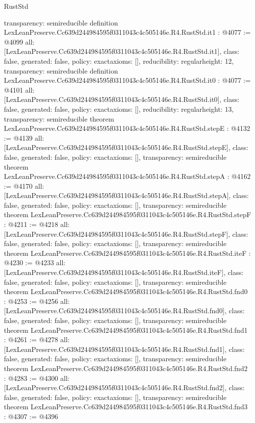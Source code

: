 \begin{lexlean}{RustStd}
\begin{coremodule}
{  transparency: semireducible
}
definition LexLeanPreserve.Cc639d244984595f0311043c4c505146e.R4.RustStd.it1 : @4077 := @4099 {
  all: [LexLeanPreserve.Cc639d244984595f0311043c4c505146e.R4.RustStd.it1],
  class: false,
  generated: false,
  policy: exact{axioms: []},
  reducibility: regular{height: 12},
  transparency: semireducible
}
definition LexLeanPreserve.Cc639d244984595f0311043c4c505146e.R4.RustStd.it0 : @4077 := @4101 {
  all: [LexLeanPreserve.Cc639d244984595f0311043c4c505146e.R4.RustStd.it0],
  class: false,
  generated: false,
  policy: exact{axioms: []},
  reducibility: regular{height: 13},
  transparency: semireducible
}
theorem LexLeanPreserve.Cc639d244984595f0311043c4c505146e.R4.RustStd.stepE : @4132 := @4139 {
  all: [LexLeanPreserve.Cc639d244984595f0311043c4c505146e.R4.RustStd.stepE],
  class: false,
  generated: false,
  policy: exact{axioms: []},
  transparency: semireducible
}
theorem LexLeanPreserve.Cc639d244984595f0311043c4c505146e.R4.RustStd.stepA : @4162 := @4170 {
  all: [LexLeanPreserve.Cc639d244984595f0311043c4c505146e.R4.RustStd.stepA],
  class: false,
  generated: false,
  policy: exact{axioms: []},
  transparency: semireducible
}
theorem LexLeanPreserve.Cc639d244984595f0311043c4c505146e.R4.RustStd.stepF : @4211 := @4218 {
  all: [LexLeanPreserve.Cc639d244984595f0311043c4c505146e.R4.RustStd.stepF],
  class: false,
  generated: false,
  policy: exact{axioms: []},
  transparency: semireducible
}
theorem LexLeanPreserve.Cc639d244984595f0311043c4c505146e.R4.RustStd.iteF : @4230 := @4233 {
  all: [LexLeanPreserve.Cc639d244984595f0311043c4c505146e.R4.RustStd.iteF],
  class: false,
  generated: false,
  policy: exact{axioms: []},
  transparency: semireducible
}
theorem LexLeanPreserve.Cc639d244984595f0311043c4c505146e.R4.RustStd.fnd0 : @4253 := @4256 {
  all: [LexLeanPreserve.Cc639d244984595f0311043c4c505146e.R4.RustStd.fnd0],
  class: false,
  generated: false,
  policy: exact{axioms: []},
  transparency: semireducible
}
theorem LexLeanPreserve.Cc639d244984595f0311043c4c505146e.R4.RustStd.fnd1 : @4261 := @4278 {
  all: [LexLeanPreserve.Cc639d244984595f0311043c4c505146e.R4.RustStd.fnd1],
  class: false,
  generated: false,
  policy: exact{axioms: []},
  transparency: semireducible
}
theorem LexLeanPreserve.Cc639d244984595f0311043c4c505146e.R4.RustStd.fnd2 : @4283 := @4300 {
  all: [LexLeanPreserve.Cc639d244984595f0311043c4c505146e.R4.RustStd.fnd2],
  class: false,
  generated: false,
  policy: exact{axioms: []},
  transparency: semireducible
}
theorem LexLeanPreserve.Cc639d244984595f0311043c4c505146e.R4.RustStd.fnd3 : @4307 := @4396 {
}
\end{coremodule}
\end{lexlean}
